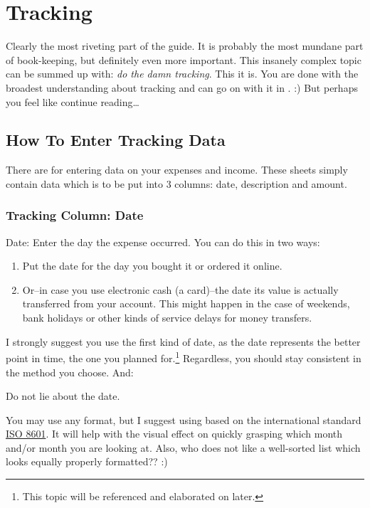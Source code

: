 \section{Tracking}
\label{sec:Tracking}

Clearly the most riveting part of the guide.
It is probably the most mundane part of book-keeping, but definitely even more important.
This insanely complex topic can be summed up with: \emph{do the damn tracking}.
This it is.
You are done with the broadest understanding about tracking and can go on with it in \tfn. :)
But perhaps you feel like continue reading\ldots

\subsection{How To Enter Tracking Data}
\label{subsec:enter-tracking-data}

There are  for entering data on your expenses and income.
These sheets simply contain data which is to be put into 3 columns: date, description and amount.

\subsubsection{Tracking Column: Date}
\label{subsec:tracking-column-date}

Date: Enter the day the expense occurred.
You can do this in two ways:
\begin{enumerate}
	\item Put the date for the day you bought it or ordered it online.
	\item Or--in case you use electronic cash (a card)--the date its value is actually transferred from your account.
	This might happen in the case of weekends, bank holidays or other kinds of service delays for money transfers.
\end{enumerate}
I strongly suggest you use the first kind of date, as the date represents the better point in time, \ie the one you planned for.\footnote{This topic will be referenced and elaborated on later.}
Regardless, you should stay consistent in the method you choose.
And:

\begin{center}
	Do not lie about the date.
\end{center}

You may use any format, but I suggest using  based on the international standard \href{https://en.wikipedia.org/wiki/ISO_8601}{ISO 8601}.
It will help with the visual effect on quickly grasping which month and/or month you are looking at.
Also, who does not like a well-sorted list which looks equally properly formatted?? :)

